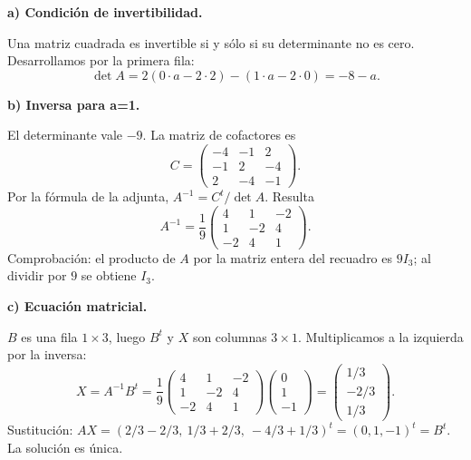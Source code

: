 \textbf{a) Condición de invertibilidad.}\par\nopagebreak[4]
Una matriz cuadrada es invertible si y sólo si su determinante no es cero. Desarrollamos por la primera fila:
\[
\det A=2(0\cdot a-2\cdot2)-(1\cdot a-2\cdot0)=-8-a.
\]

\textbf{b) Inversa para a=1.}\par\nopagebreak[4]
El determinante vale $-9$. La matriz de cofactores es
\[
C=\begin{pmatrix}-4&-1&2\\-1&2&-4\\2&-4&-1\end{pmatrix}.
\]
Por la fórmula de la adjunta, $A^{-1}=C^t/\det A$. Resulta
\[
\boxed{A^{-1}=\frac19\begin{pmatrix}4&1&-2\\1&-2&4\\-2&4&1\end{pmatrix}.}
\]
Comprobación: el producto de $A$ por la matriz entera del recuadro es $9I_3$; al dividir por $9$ se obtiene $I_3$.

\textbf{c) Ecuación matricial.}\par\nopagebreak[4]
$B$ es una fila $1\times3$, luego $B^t$ y $X$ son columnas $3\times1$. Multiplicamos a la izquierda por la inversa:
\[
X=A^{-1}B^t=\frac19
\begin{pmatrix}4&1&-2\\1&-2&4\\-2&4&1\end{pmatrix}
\begin{pmatrix}0\\1\\-1\end{pmatrix}
=\boxed{\begin{pmatrix}1/3\\-2/3\\1/3\end{pmatrix}.}
\]
Sustitución: $AX=(2/3-2/3,\ 1/3+2/3,\ -4/3+1/3)^t=(0,1,-1)^t=B^t$. La solución es única.
